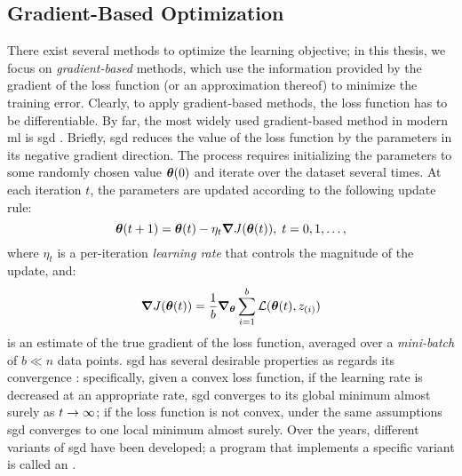 \subsection{Gradient-Based Optimization}
There exist several methods to optimize the learning objective; in this thesis, we focus on \emph{gradient-based} methods, which use the information provided by the gradient of the loss function (or an approximation thereof) to minimize the training error. Clearly, to apply gradient-based methods, the loss function has to be differentiable. By far, the most widely used gradient-based method in modern \gls{ml} is \gls{sgd} \citep{ruder2016overviewsgd}. Briefly, \gls{sgd} reduces the value of the loss function by  the parameters in its negative gradient direction. The process requires initializing the parameters to some randomly chosen value $\Param(0)$ and iterate over the dataset several times. At each iteration $t$, the parameters are updated according to the following update rule:
$$ \Param(t+1) = \Param(t) - \eta_t \grad J(\Param(t)),\; t= 0, 1, \ldots,$$
where $\eta_t$ is a per-iteration \emph{learning rate} that controls the magnitude of the update, and:
$$ \grad J(\Param(t)) = \frac{1}{b} \grad_{\Param}  \sum_{i=1}^{b} \Loss(\Param(t), \Pattern{z}{i})$$
is an estimate of the true gradient of the loss function, averaged over a \emph{mini-batch} of $b \ll n$ data points. \gls{sgd} has several desirable properties as regards its convergence \citep{robbins1951stochastic}: specifically, given a convex loss function, if the learning rate is decreased at an appropriate rate, \gls{sgd} converges to its global minimum almost surely as $t \shortrightarrow \infty$; if the loss function is not convex, under the same assumptions \gls{sgd} converges to one local minimum almost surely. Over the years, different variants of \gls{sgd} have been developed; a program that implements a specific variant is called an .

